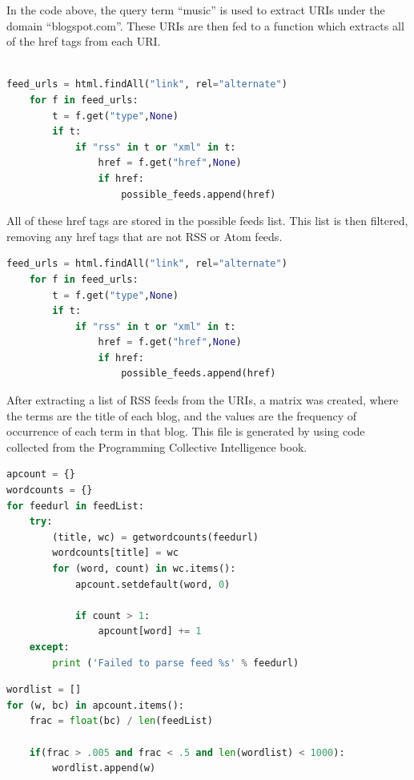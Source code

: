 \documentclass[11pt]{scrartcl} %
\begin{document}
\tabto{2.0cm} In the code above, the query term ``music'' is used to extract URIs under the domain ``blogspot.com''. These URIs are then fed to a function which extracts all of the href tags from each URI.


\begin{lstlisting}[language = Python, caption=Grab href]

feed_urls = html.findAll("link", rel="alternate")
    for f in feed_urls:
        t = f.get("type",None)
        if t:
            if "rss" in t or "xml" in t:
                href = f.get("href",None)
                if href:
                    possible_feeds.append(href)
\end{lstlisting} \bigskip 

\tabto{2.0cm} All of these href tags are stored in the possible feeds list. This list is then filtered, removing any href tags that are not RSS or Atom feeds.

\begin{lstlisting}[language = Python, caption=Scraping URIs]
feed_urls = html.findAll("link", rel="alternate")
    for f in feed_urls:
        t = f.get("type",None)
        if t:
            if "rss" in t or "xml" in t:
                href = f.get("href",None)
                if href:
                    possible_feeds.append(href)
\end{lstlisting} \bigskip 

\pagebreak

\tabto{2.0cm} After extracting a list of RSS feeds from the URIs, a matrix was created, where the terms are the title of each blog, and the values are the frequency of occurrence of each term in that blog. This file is generated by using code collected from the Programming Collective Intelligence book. 


\begin{lstlisting}[language = Python, caption=Extract Words from Title]
apcount = {}
wordcounts = {}
for feedurl in feedList:
	try:
		(title, wc) = getwordcounts(feedurl)
		wordcounts[title] = wc
		for (word, count) in wc.items():
			apcount.setdefault(word, 0)

			if count > 1:
				apcount[word] += 1
	except:
		print ('Failed to parse feed %s' % feedurl)
\end{lstlisting} \bigskip 

\begin{lstlisting}[language = Python, caption=Extract Highest Terms]
wordlist = []
for (w, bc) in apcount.items():
	frac = float(bc) / len(feedList)

	if(frac > .005 and frac < .5 and len(wordlist) < 1000):
		wordlist.append(w)
\end{lstlisting} \bigskip 
\end{document}

